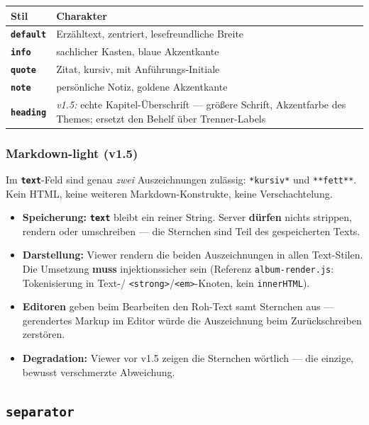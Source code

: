 \documentclass[11pt,a4paper]{article}
\let\mpdtt\texttt
\renewcommand{\texttt}[1]{\mpdtt{\textcolor{mpdred}{#1}}}
\newcommand{\feld}[1]{\mpdtt{\textbf{\textcolor{mpdred}{#1}}}}
\newcommand{\kopf}[1]{\textbf{#1}}
\begin{document}
\begin{tabularx}{\linewidth}{|l|L|}
\hline
{}\kopf{Stil} & \kopf{Charakter} \\
\hline
\feld{default} & Erzähltext, zentriert, lesefreundliche Breite \\
\feld{info} & sachlicher Kasten, blaue Akzentkante \\
\feld{quote} & Zitat, kursiv, mit Anführungs-Initiale \\
\feld{note} & persönliche Notiz, goldene Akzentkante \\
\feld{heading} & \emph{v1.5:} echte Kapitel-Überschrift — größere Schrift, Akzentfarbe des Themes; ersetzt den Behelf über Trenner-Labels \\
\hline
\end{tabularx}

\subsubsection*{Markdown-light \;(v1.5)}\label{sec:mdlight}

Im \feld{text}-Feld sind genau \emph{zwei} Auszeichnungen zulässig:
\texttt{*kursiv*} und \texttt{**fett**}. Kein HTML, keine weiteren
Markdown-Konstrukte, keine Verschachtelung.

\begin{itemize}
  \item \textbf{Speicherung:} \feld{text} bleibt ein reiner String.
        Server \textbf{dürfen} nichts strippen, rendern oder
        umschreiben — die Sternchen sind Teil des gespeicherten Texts.
  \item \textbf{Darstellung:} Viewer rendern die beiden Auszeichnungen
        in allen Text-Stilen. Die Umsetzung \textbf{muss} injektionssicher
        sein (Referenz \texttt{album-render.js}: Tokenisierung in Text-/%
        \texttt{<strong>}/\texttt{<em>}-Knoten, kein \texttt{innerHTML}).
  \item \textbf{Editoren} geben beim Bearbeiten den Roh-Text samt
        Sternchen aus — gerendertes Markup im Editor würde die
        Auszeichnung beim Zurückschreiben zerstören.
  \item \textbf{Degradation:} Viewer vor v1.5 zeigen die Sternchen
        wörtlich — die einzige, bewusst verschmerzte Abweichung.
\end{itemize}

\subsection{\texttt{separator}}
\end{document}
